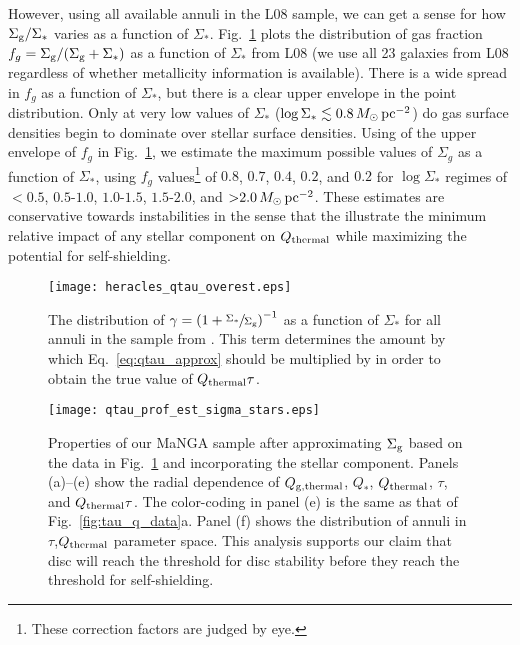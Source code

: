 \documentclass[fleqn,usenatbib]{mnras}
\newcommand{\qh}{Q_{\rm thermal}}
\newcommand{\qgh}{Q_{\rm g,thermal}}
\begin{document}
{However, using all available annuli in the L08 sample, we can get a sense for how $\Sigma_{\rm g}/\Sigma_*$ varies as a function of $\Sigma_*$. Fig.~\ref{fig:heracles_qtau_overest} plots the distribution of gas fraction  $f_g={\Sigma_{\rm g}}/{\left(\Sigma_{\rm g}+\Sigma_*\right)}$ as a function of $\Sigma_*$ from L08 (we use all 23 galaxies from L08 regardless of whether metallicity information is available).  There is a wide spread in $f_g$ as a function of $\Sigma_*$, but there is a clear upper envelope in the point distribution.  Only at very low values of $\Sigma_*$ ($\log \Sigma_* \lesssim 0.8\,M_{\odot}\,{\rm pc^{-2}}$) do gas surface densities begin to dominate over stellar surface densities.  Using of the upper envelope of $f_g$ in Fig.~\ref{fig:heracles_qtau_overest}, we estimate the maximum possible values of $\Sigma_g$ as a function of $\Sigma_*$, using $f_g$ values\footnote{These correction factors are judged by eye.} of  $0.8$, $0.7$, $0.4$, $0.2$, and $0.2$ for $\log \Sigma_*$ regimes of ${<}0.5$, $0.5$-$1.0$, $1.0$-$1.5$, $1.5$-$2.0$, and ${>}2.0\,M_{\odot}\,{\rm pc^{-2}}$.  These estimates are conservative towards instabilities in the sense that the illustrate the minimum relative impact of any stellar component on $\qh$ while maximizing the potential for self-shielding. 

\begin{figure}
\texttt{[image: heracles\_qtau\_overest.eps]}
\caption{The distribution of $\gamma=\left(1+\sfrac{\Sigma_*}{\Sigma_{\rm g}}\right)^{-1}$ as a function of $\Sigma_*$ for all annuli in the sample from \citet{Leroy08}.  This term determines the amount by which Eq.~\ref{eq:qtau_approx} should be multiplied by in order to obtain the true value of $\qh\tau$.}
\label{fig:heracles_qtau_overest}
\end{figure}

\begin{figure*}
\texttt{[image: qtau\_prof\_est\_sigma\_stars.eps]}
\caption{Properties of our MaNGA sample after approximating $\Sigma_{\rm g}$ based on the data in Fig.~\ref{fig:heracles_qtau_overest} and incorporating the stellar component.  Panels (a)--(e) show the radial dependence of $\qgh$,  $Q_*$, $\qh$, $\tau$, and $\qh\tau$. The color-coding in panel (e) is the same as that of Fig.~\ref{fig:tau_q_data}a. Panel (f) shows the distribution of annuli in $\tau$,$\qh$ parameter space. This analysis supports our claim that disc will reach the threshold for disc stability before they reach the threshold for self-shielding.}
\label{fig:manga_qtau_corr}
\end{figure*}

}
\end{document}
